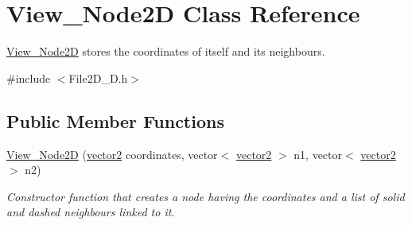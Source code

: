 \hypertarget{class_view___node2_d}{}\section{View\+\_\+\+Node2D Class Reference}
\label{class_view___node2_d}


\mbox{\hyperlink{class_view___node2_d}{View\+\_\+\+Node2D}} stores the coordinates of itself and its neighbours.  




{\ttfamily \#include $<$File2\+D\+\_\+D.\+h$>$}

\subsection*{Public Member Functions}
\begin{DoxyCompactItemize}
\item 
\mbox{\label{class_view___node2_d_a36df4aefa963565d0c6677b5783c7cc1}} 
\mbox{\hyperlink{class_view___node2_d_a36df4aefa963565d0c6677b5783c7cc1}{View\+\_\+\+Node2D}} (\mbox{\hyperlink{classvector2}{vector2}} coordinates, vector$<$ \mbox{\hyperlink{classvector2}{vector2}} $>$ n1, vector$<$ \mbox{\hyperlink{classvector2}{vector2}} $>$ n2)
\begin{DoxyCompactList}\small\item\em Constructor function that creates a node having the coordinates and a list of solid and dashed neighbours linked to it. \end{DoxyCompactList}\end{DoxyCompactItemize}
